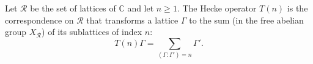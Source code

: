 Let $\mathcal{R}$ be the set of lattices of $\mathbb{C}$ and let $n \geq 1$. The Hecke operator $T(n)$ is the correspondence on $\mathcal{R}$ that transforms a lattice $\Gamma$ to the sum (in the free abelian group $X_{\mathcal{R}}$) of its sublattices of index $n$:
$$T(n)\Gamma = \sum_{(\Gamma:\Gamma') = n} \Gamma'.$$

